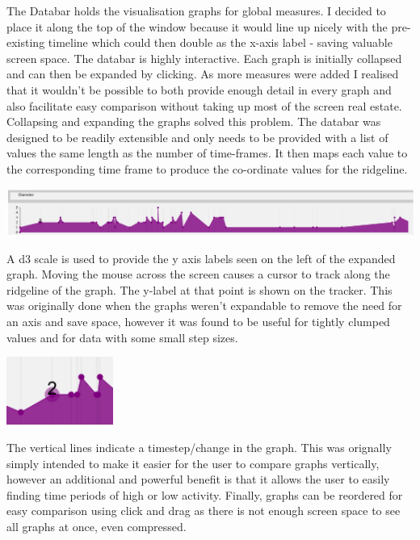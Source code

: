 The Databar holds the visualisation graphs for global measures. I decided to place it along the top of the window because it would line up nicely with the pre-existing timeline which could then double as the x-axis label - saving valuable screen space.
The databar is highly interactive. Each graph is initially collapsed and can then be expanded by clicking. As more measures were added I realised that it wouldn't be possible to both provide enough detail in every graph and also facilitate easy comparison without taking up most of the screen real estate. Collapsing and expanding the graphs solved this problem. The databar was designed to be readily extensible and only needs to be provided with a list of values the same length as the number of time-frames. It then maps each value to the corresponding time frame to produce the co-ordinate values for the ridgeline. 

\begin{center}
\includegraphics[trim={0 0 0 0}, width=140mm]{./Figures/diameterGraph.png}
\end{center}
A d3 scale is used to provide the y axis labels seen on the left of the expanded graph. Moving the mouse across the screen causes a cursor to track along the ridgeline of the graph. The y-label at that point is shown on the tracker. This was originally done when the graphs weren't expandable to remove the need for an axis and save space, however it was found to be useful for tightly clumped values and for data with some small step sizes.
\begin{center}
\includegraphics[trim={0 0 0 0}, width=35mm]{./Figures/ridgeTracker.png}
\end{center}
The vertical lines indicate a timestep/change in the graph. This was orignally simply intended to make it easier for the user to  compare graphs vertically, however an additional and powerful benefit is that it allows the user to  easily finding time periods of high or low activity.
Finally, graphs can be reordered for easy comparison using click and drag as there is not enough screen space to see all graphs at once, even compressed.

